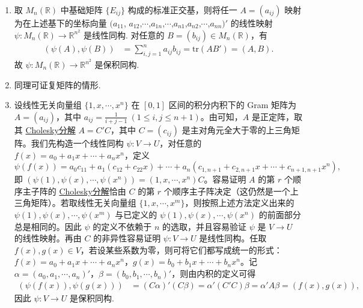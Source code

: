 \documentclass[../../main.tex]{subfiles}%
\begin{document}
\begin{solution}
\begin{enumerate}
\item 取 \(M_n(\mathbb{R})\) 中基础矩阵 \(\{E_{ij}\}\) 构成的标准正交基，则将任一 \(A=(a_{ij})\) 映射为在上述基下的坐标向量 $(a_{11}$, $a_{12}$,$\cdots$,$a_{1n}$,$\cdots$,$a_{n1}$,$a_{n2}$,$\cdots$,$a_{nn})'$ 的线性映射 \(\psi:M_n(\mathbb{R})\rightarrow\mathbb{R}^{n^2}\) 是线性同构. 对任意的 \(B=(b_{ij})\in M_n(\mathbb{R})\)，有
\begin{align*}
(\psi(A),\psi(B))&=\sum_{i,j = 1}^{n}a_{ij}b_{ij}= \mathrm{tr}\left( AB'\right) =(A,B).
\end{align*}
故 \(\psi:M_n(\mathbb{R})\rightarrow\mathbb{R}^{n^2}\) 是保积同构.

\item 同理可证复矩阵的情形.

\item 设线性无关向量组 \(\{1,x,\cdots,x^n\}\) 在 \([0,1]\) 区间的积分内积下的 Gram 矩阵为 \(A=(a_{ij})\)，其中 \(a_{ij}=\frac{1}{i + j - 1}\ (1\leqslant  i,j\leqslant  n + 1)\)。由可知，\(A\) 是正定阵，取其 \hyperref[proposition:正定阵的3个充要条件]{Cholesky分解} \(A = C'C\)，其中 \(C=(c_{ij})\) 是主对角元全大于零的上三角矩阵。我们先构造一个线性同构 \(\psi:V\rightarrow U\)，对任意的 \(f(x)=a_0 + a_1x+\cdots + a_nx^n\)，定义
\[
\psi(f(x))=a_0c_{11}+a_1(c_{12}+c_{22}x)+\cdots + a_n(c_{1,n + 1}+c_{2,n + 1}x+\cdots + c_{n + 1,n + 1}x^n),
\]
即 \((\psi(1),\psi(x),\cdots,\psi(x^n))=(1,x,\cdots,x^n)C\)。容易证明 \(A\) 的第 \(r\) 个顺序主子阵的  \hyperref[proposition:正定阵的3个充要条件]{Cholesky分解}恰由 \(C\) 的第 \(r\) 个顺序主子阵决定（这仍然是一个上三角矩阵）。若取线性无关向量组 \(\{1,x,\cdots,x^m\}\)，则按照上述方法定义出来的 \(\psi(1),\psi(x),\cdots,\psi(x^m)\) 与已定义的 \(\psi(1),\psi(x),\cdots,\psi(x^n)\) 的前面部分总是相同的。因此 \(\psi\) 的定义不依赖于 \(n\) 的选取，并且容易验证 \(\psi\) 是 \(V\rightarrow U\) 的线性映射。再由 \(C\) 的非异性容易证明 \(\psi:V\rightarrow U\) 是线性同构。任取 \(f(x),g(x)\in V\)，若设某些系数为零，则可将它们都写成统一的形式：\(f(x)=a_0 + a_1x+\cdots + a_nx^n\)，\(g(x)=b_0 + b_1x+\cdots + b_nx^n\)。记 \(\alpha=(a_0,a_1,\cdots,a_n)'\)，\(\beta=(b_0,b_1,\cdots,b_n)'\)，则由内积的定义可得
\begin{align*}
(\psi(f(x)),\psi(g(x)))&=(C\alpha)'(C\beta)=\alpha'(C'C)\beta=\alpha'A\beta=(f(x),g(x)),
\end{align*}
因此 \(\psi:V\rightarrow U\) 是保积同构.
\end{enumerate}

\end{solution}
\end{document}
